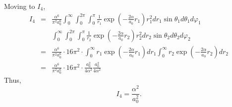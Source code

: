 \documentclass{article}
\numberwithin{equation}{section}
\begin{document}
Moving to $I_4$,
\begin{eqnarray*}
I_4 &=& \frac{\alpha^6}{\pi^2 a_0^6}
\int_0^\infty\int_0^{2\pi}\int_0^\pi
\frac{1}{r_1}\exp\left(-\frac{2\alpha}{a_0}r_1\right)
r_1^2dr_1\sin\theta_1d\theta_1d\varphi_1 \\
 & & 
\int_0^\infty\int_0^{2\pi}\int_0^\pi
\frac{1}{r_2}\exp\left(-\frac{2\alpha}{a_0}r_2\right)
r_2^2dr_2\sin\theta_2d\theta_2d\varphi_2 \\
&=& \frac{\alpha^6}{\pi^2 a_0^6} \cdot 16\pi^2 \cdot
\int_0^\infty r_1\exp\left(-\frac{2\alpha}{a_0}r_1\right)dr_1
\int_0^\infty r_2\exp\left(-\frac{2\alpha}{a_0}r_2\right)dr_2 \\
&=& \frac{\alpha^6}{\pi^2 a_0^6} \cdot 16\pi^2 \cdot
\frac{a_0^2}{4\alpha^2}\frac{a_0^2}{4\alpha^2}
\end{eqnarray*}
Thus,
\begin{equation}\label{s5e76}
I_4 = \frac{\alpha^2}{a_0^2}.
\end{equation}
\end{document}
